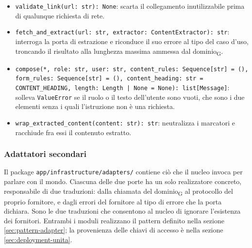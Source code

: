 \documentclass[a4paper, 10pt]{article}
\newenvironment{firme}{%
  \begin{itemize}[leftmargin=1.4em, topsep=4pt, itemsep=4pt, parsep=0pt]
  \raggedright
}{%
  \end{itemize}%
}
\begin{document}
\begin{firme}
    \item \texttt{validate\_link(url: str): None}: scarta il collegamento inutilizzabile prima di qualunque richiesta di rete.

    \item \texttt{fetch\_and\_extract(url: str, extractor: ContentExtractor): str}: interroga la porta di estrazione e riconduce il suo errore al tipo del caso d'uso, troncando il risultato alla lunghezza massima ammessa dal dominio\textsubscript{G}.

    \item \texttt{compose(*, role: str, user: str, content\_rules: Sequence[str] = (), form\_rules: Sequence[str] = (), content\_heading: str = CONTENT\_HEADING, length: Length | None = None): list[Message]}: solleva \texttt{ValueError} se il ruolo o il testo dell'utente sono vuoti, che sono i due elementi senza i quali l'istruzione non è una richiesta.

    \item \texttt{wrap\_extracted\_content(content: str): str}: neutralizza i marcatori e racchiude fra essi il contenuto estratto.
\end{firme}

\subsubsection{Adattatori secondari}
\label{sec:backend-adattatori-secondari}
Il package \texttt{app/infrastructure/adapters/} contiene ciò che il nucleo invoca per parlare con il mondo. Ciascuna delle due porte ha un solo realizzatore concreto, responsabile di due traduzioni: dalla chiamata del dominio\textsubscript{G} al protocollo del proprio fornitore, e dagli errori del fornitore al tipo di errore che la porta dichiara. Sono le due traduzioni che consentono al nucleo di ignorare l'esistenza dei fornitori. Entrambi i moduli realizzano il pattern definito nella sezione \ref{sec:pattern-adapter}; la provenienza delle chiavi di accesso è nella sezione \ref{sec:deployment-unita}.
\end{document}
